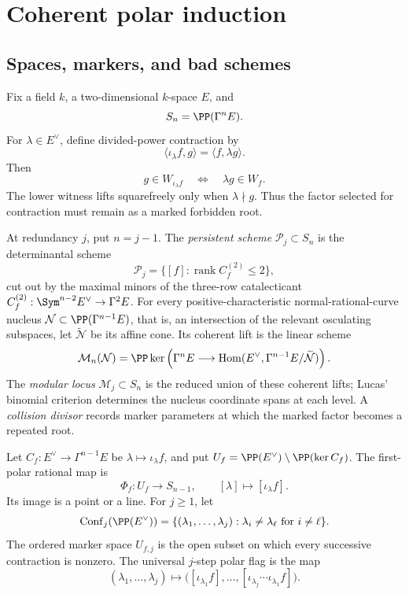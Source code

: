 \section{Coherent polar induction}\label{sec:polar}

\subsection{Spaces, markers, and bad schemes}

Fix a field $k$, a two-dimensional $k$-space $E$, and
\[
  S_n=\PP(\Gamma^nE).
\]
For $\lambda\in E^\vee$, define divided-power contraction by
\[
 \langle\iota_\lambda f,g\rangle=\langle f,\lambda g\rangle.
\]
Then
\begin{equation}\label{eq:lift}
 g\in W_{\iota_\lambda f}\quad\Longleftrightarrow\quad
 \lambda g\in W_f.
\end{equation}
The lower witness lifts squarefreely only when $\lambda\nmid g$.
Thus the factor selected for contraction must remain as a marked
forbidden root.

\begin{definition}\label{def:carriers}
At redundancy \(j\), put \(n=j-1\).  The \emph{persistent scheme}
\(\mathcal P_j\subset S_n\) is the determinantal scheme
\[
 \mathcal P_j
 =\{[f]:\operatorname{rank}C_f^{(2)}\leq2\},
\]
cut out by the maximal minors of the three-row catalecticant
\(C_f^{(2)}:\Sym^{n-2}E^\vee\to\Gamma^2E\).
For every positive-characteristic normal-rational-curve nucleus
\(\mathcal N\subset\PP(\Gamma^{n-1}E)\), that is, an intersection of
the relevant osculating subspaces, let
\(\widetilde{\mathcal N}\) be its affine cone.  Its coherent lift is
the linear scheme
\[
 \mathcal M_n(\mathcal N)=
 \PP\ker\left(
 \Gamma^nE\longrightarrow
 \operatorname{Hom}(E^\vee,\Gamma^{n-1}E/\widetilde{\mathcal N})
 \right).
\]
The \emph{modular locus} \(\mathcal M_j\subset S_n\) is the reduced
union of these coherent lifts; Lucas' binomial criterion determines
the nucleus coordinate spans at each level.  A
\emph{collision divisor} records marker parameters at which the
marked factor becomes a repeated root.
\end{definition}

\begin{definition}\label{def:polar-spaces}
Let $C_f:E^\vee\to\Gamma^{n-1}E$ be
$\lambda\mapsto\iota_\lambda f$, and put
$U_f=\PP(E^\vee)\setminus\PP(\ker C_f)$.  The first-polar rational map
is
\[
 \Phi_f:U_f\longrightarrow S_{n-1},\qquad
 [\lambda]\longmapsto[\iota_\lambda f]
.
\]
Its image is a point or a line.  For $j\geq1$, let
\[
\operatorname{Conf}_j(\PP(E^\vee))
=\{(\lambda_1,\ldots,\lambda_j):\lambda_i\ne\lambda_\ell
  \text{ for }i\ne\ell\}.
\]
The ordered marker space $U_{f,j}$ is the open subset on which every
successive contraction is nonzero.  The universal $j$-step polar flag
is the map
\[
(\lambda_1,\ldots,\lambda_j)\longmapsto
\bigl([\iota_{\lambda_1}f],\ldots,
[\iota_{\lambda_j}\cdots\iota_{\lambda_1}f]\bigr).
\]
\end{definition}

